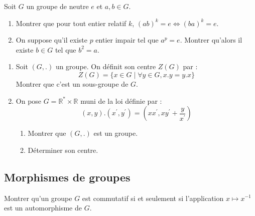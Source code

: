 \begin{exercice}
Soit $G$ un groupe de neutre $e$ et $a,b\in G$.
\begin{enumerate}
    \item Montrer que pour tout entier relatif $k$, $(ab)^{k}=e\iff(ba)^{k}=e$.
    \item On suppose qu'il existe $p$ entier impair tel que $a^{p}=e$. Montrer qu'alors il existe $b\in G$ tel que $b^{2}=a$.
\end{enumerate}
\end{exercice}

\begin{exercice}
\begin{enumerate}
    \item Soit $(G,.)$ un groupe. On définit son centre $Z(G)$ par :
    $$ Z(G)=\{x\in G \mid \forall y\in G, x.y=y.x\} $$
    Montrer que c'est un sous-groupe de $G$.
    \item On pose $G=\mathbb{R}^{*}\times\mathbb{R}$ muni de la loi définie par :
    $$ (x,y).(x^{\prime},y^{\prime})=(xx^{\prime},xy^{\prime}+\frac{y}{x^{\prime}}) $$
    \begin{enumerate}
        \item Montrer que $(G,.)$ est un groupe.
        \item Déterminer son centre.
    \end{enumerate}
\end{enumerate}
\end{exercice}

\subsection{Morphismes de groupes}

\begin{exercice}
Montrer qu'un groupe $G$ est commutatif si et seulement si l'application $x\mapsto x^{-1}$ est un automorphisme de $G$.
\end{exercice}

